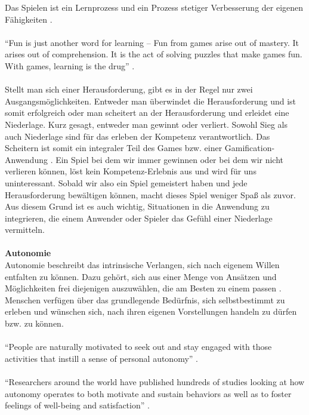 \documentclass[a4paper,12pt]{scrartcl}
\begin{document}
Das Spielen ist ein Lernprozess und ein Prozess stetiger Verbesserung der eigenen Fähigkeiten \cite{Rigby2011}.
\\\\
\enquote{Fun is just another word for learning – Fun from games arise out of mastery. It arises out of comprehension. It is the act of solving puzzles that make games fun. With games, learning is the drug} \cite{Koster2013}. 
\\\\
Stellt man sich einer Herausforderung, gibt es in der Regel nur zwei Ausgangsmöglichkeiten. Entweder man überwindet die Herausforderung und ist somit erfolgreich oder man scheitert an der Herausforderung und erleidet eine Niederlage. Kurz gesagt, entweder man gewinnt oder verliert. Sowohl Sieg als auch Niederlage sind für das erleben der Kompetenz verantwortlich. Das Scheitern ist somit ein integraler Teil des Games bzw. einer Gamification-Anwendung \cite{Mcgonigal2011}\cite{Lazzaro2004}. Ein Spiel bei dem wir immer gewinnen oder bei dem wir nicht verlieren können, löst kein Kompetenz-Erlebnis aus und wird für uns uninteressant. Sobald wir also ein Spiel gemeistert haben und jede Herausforderung bewältigen können, macht dieses Spiel weniger Spaß als zuvor. Aus diesem Grund ist es auch wichtig, Situationen in die Anwendung zu integrieren, die einem Anwender oder Spieler das Gefühl einer Niederlage vermitteln. 
\\\\
\textbf{Autonomie}\\
Autonomie beschreibt das intrinsische Verlangen, sich nach eigenem Willen entfalten zu können. Dazu gehört, sich aus einer Menge von Ansätzen und Möglichkeiten frei diejenigen auszuwählen, die am Besten zu einem passen \cite{Rigby2011}. Menschen verfügen über das grundlegende Bedürfnis, sich selbstbestimmt zu erleben und wünschen sich, nach ihren eigenen Vorstellungen handeln zu dürfen bzw. zu können.
\\\\
\enquote{People are naturally motivated to seek out and stay engaged with those activities that instill a sense of personal autonomy} \cite{Rigby2011}.
\\\\
\enquote{Researchers around the world have published hundreds of studies looking at how autonomy operates to both motivate and sustain behaviors as well as to foster feelings of well-being and satisfaction} \cite{Rigby2011}.
\\\\
\end{document}
